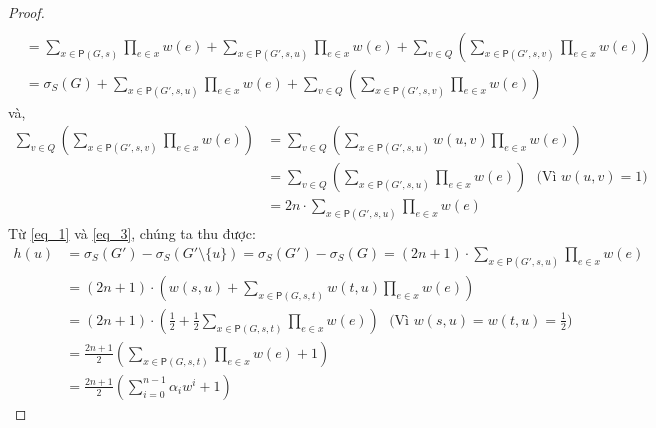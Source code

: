 \begin{proof}
\begin{align}
	\\
	&  =\sum_{x \in \mathsf{P}(G, s)} \prod_{e \in x}w(e) + \sum_{x \in \mathsf{P}(G', s, u)} \prod_{e \in x}w(e) + \sum_{v \in   Q } \left(  \sum_{x \in \mathsf{P}(G', s, v)} \prod_{e \in x}w(e)  \right)  \nonumber
	\\
	& = \sigma_{S}(G) +  \sum_{x \in \mathsf{P}(G', s, u)} \prod_{e \in x}w(e) +  \sum_{v \in Q } \left(  \sum_{x \in \mathsf{P}(G', s, v)} \prod_{e \in x}w(e)  \right) 
	\label{eq_1}
	\end{align}  
	và, 
	\begin{align}
	\sum_{v \in  Q } \left(  \sum_{x \in \mathsf{P}(G', s, v)} \prod_{e \in x}w(e)  \right) &= \sum_{v \in Q} \left(  \sum_{x \in \mathsf{P}(G', s, u)} w(u, v)  \prod_{e \in x}w(e)  \right) \nonumber
	\\
	& =\sum_{v \in Q} \left(  \sum_{x \in \mathsf{P}(G', s, u)} \prod_{e \in x}w(e)  \right)\ \ \ \mbox{(Vì $w(u, v)=1$)} \nonumber
	\\
	& = 2n \cdot \sum_{x \in \mathsf{P}(G', s, u)} \prod_{e \in x}w(e)
	\label{eq_3}
	\end{align}
	Từ \eqref{eq_1} và \eqref{eq_3}, chúng ta thu được:
	\begin{align}
	h(u)&= \sigma_{S}(G')- \sigma_{S}(G'\setminus \{u\})=  \sigma_{S}(G')- \sigma_{S}(G)=(2n+1)\cdot \sum_{x \in \mathsf{P}(G', s, u)} \prod_{e \in x}w(e)
	\\
	& = (2n+1)\cdot \left(  w(s, u)+ \sum_{x \in \mathsf{P}(G, s, t)} w(t, u) \prod_{e \in x}w(e) \right) 
	\\
	& = (2n+1)\cdot \left(  \frac{1}{2}+ \frac{1}{2} \sum_{x \in \mathsf{P}(G, s, t)}  \prod_{e \in x}w(e) \right)  \ \ \ \mbox{(Vì $w(s, u)= w(t, u)=\frac{1}{2}$)}
	\\
	& = \frac{2n+1}{2} \left(  \sum_{x \in \mathsf{P}(G, s, t)}  \prod_{e \in x}w(e) +1 \right) 
	\\
	& = \frac{2n+1}{2} \left(  \sum_{i=0}^{n-1} \alpha_i w^i +1 \right) 
	\end{align}   		

\end{proof}
